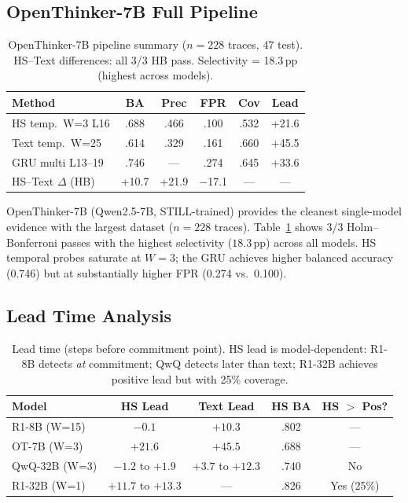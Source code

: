 \documentclass[11pt]{article}
\newcommand{\pp}{\,\text{pp}}
\begin{document}
\subsection{OpenThinker-7B Full Pipeline}
\label{sec:ot7b}

\begin{table}[t]
\centering
\small
\begin{tabular}{@{}lccccc@{}}
\toprule
\textbf{Method} & \textbf{BA} & \textbf{Prec} & \textbf{FPR} & \textbf{Cov} & \textbf{Lead} \\
\midrule
HS temp.\ W=3 L16 & .688 & .466 & .100 & .532 & +21.6 \\
Text temp.\ W=25 & .614 & .329 & .161 & .660 & +45.5 \\
GRU multi L13--19 & .746 & --- & .274 & .645 & +33.6 \\
HS--Text $\Delta$ (HB) & +10.7 & +21.9 & $-$17.1 & --- & --- \\
\bottomrule
\end{tabular}
\caption{OpenThinker-7B pipeline summary ($n=228$ traces, 47 test). HS--Text differences: all 3/3 HB pass. Selectivity = 18.3$\pp$ (highest across models).}
\label{tab:ot7b}
\end{table}

OpenThinker-7B (Qwen2.5-7B, STILL-trained) provides the cleanest single-model evidence with the largest dataset ($n=228$ traces).
Table~\ref{tab:ot7b} shows 3/3 Holm--Bonferroni passes with the highest selectivity ($18.3\pp$) across all models.
HS temporal probes saturate at $W=3$; the GRU achieves higher balanced accuracy (0.746) but at substantially higher FPR (0.274 vs.\ 0.100).

\subsection{Lead Time Analysis}
\label{sec:lead_time}

\begin{table}[t]
\centering
\small
\begin{tabular}{@{}lcccc@{}}
\toprule
\textbf{Model} & \textbf{HS Lead} & \textbf{Text Lead} & \textbf{HS BA} & \textbf{HS $>$ Pos?} \\
\midrule
R1-8B (W=15) & $-0.1$ & $+10.3$ & .802 & --- \\
OT-7B (W=3) & $+21.6$ & $+45.5$ & .688 & --- \\
QwQ-32B (W=3) & $-1.2$ to $+1.9$ & $+3.7$ to $+12.3$ & .740 & No \\
R1-32B (W=1) & $+11.7$ to $+13.3$ & --- & .826 & Yes (25\%) \\
\bottomrule
\end{tabular}
\caption{Lead time (steps before commitment point). HS lead is model-dependent: R1-8B detects \emph{at} commitment; QwQ detects later than text; R1-32B achieves positive lead but with 25\% coverage.}
\label{tab:lead_time}
\end{table}
\end{document}
